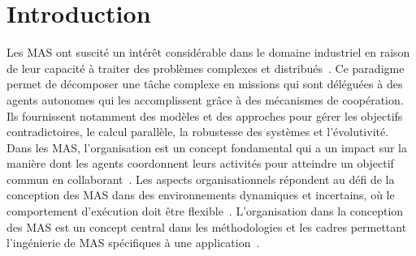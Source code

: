 














\section{Introduction}


Les MAS ont suscité un intérêt considérable dans le domaine industriel en raison de leur capacité à traiter des problèmes complexes et distribués~\cite{Raileanu2023}.
Ce paradigme permet de décomposer une tâche complexe en missions qui sont déléguées à des agents autonomes qui les accomplissent grâce à des mécanismes de coopération. Ils fournissent notamment des modèles et des approches pour gérer les objectifs contradictoires, le calcul parallèle, la robustesse des systèmes et l'évolutivité.
Dans les MAS, l'organisation est un concept fondamental qui a un impact sur la manière dont les agents coordonnent leurs activités pour atteindre un objectif commun en collaborant~\cite{Hubner2007}.
Les aspects organisationnels répondent au défi de la conception des MAS dans des environnements dynamiques et incertains, où le comportement d'exécution doit être flexible~\cite{Kathleen2020}. L'organisation dans la conception des MAS est un concept central dans les méthodologies et les cadres permettant l'ingénierie de MAS spécifiques à une application~\cite{Bakliwal2018}.

